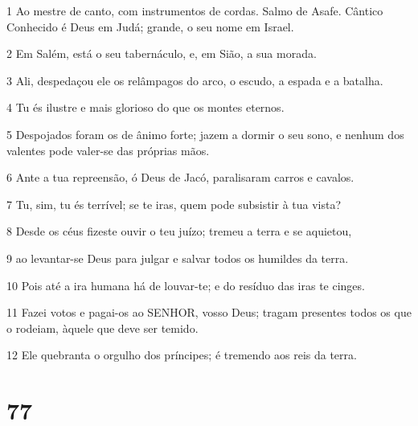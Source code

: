 \par 1 Ao mestre de canto, com instrumentos de cordas. Salmo de Asafe. Cântico Conhecido é Deus em Judá; grande, o seu nome em Israel.
\par 2 Em Salém, está o seu tabernáculo, e, em Sião, a sua morada.
\par 3 Ali, despedaçou ele os relâmpagos do arco, o escudo, a espada e a batalha.
\par 4 Tu és ilustre e mais glorioso do que os montes eternos.
\par 5 Despojados foram os de ânimo forte; jazem a dormir o seu sono, e nenhum dos valentes pode valer-se das próprias mãos.
\par 6 Ante a tua repreensão, ó Deus de Jacó, paralisaram carros e cavalos.
\par 7 Tu, sim, tu és terrível; se te iras, quem pode subsistir à tua vista?
\par 8 Desde os céus fizeste ouvir o teu juízo; tremeu a terra e se aquietou,
\par 9 ao levantar-se Deus para julgar e salvar todos os humildes da terra.
\par 10 Pois até a ira humana há de louvar-te; e do resíduo das iras te cinges.
\par 11 Fazei votos e pagai-os ao SENHOR, vosso Deus; tragam presentes todos os que o rodeiam, àquele que deve ser temido.
\par 12 Ele quebranta o orgulho dos príncipes; é tremendo aos reis da terra.

\chapter{77}

